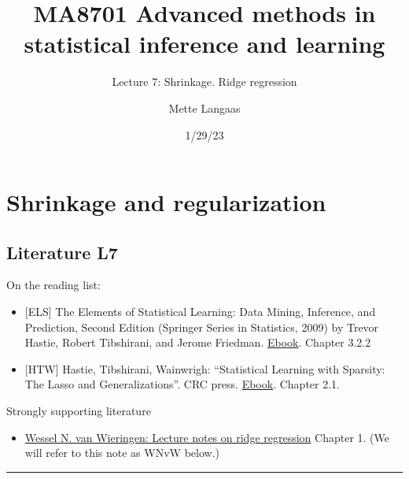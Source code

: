 \documentclass[
  letterpaper,
  DIV=11,
  numbers=noendperiod]{scrartcl}
\title{MA8701 Advanced methods in statistical inference and learning}
\subtitle{Lecture 7: Shrinkage. Ridge regression}
\author{Mette Langaas}
\date{1/29/23}
\providecommand{\tightlist}{%
  \setlength{\itemsep}{0pt}\setlength{\parskip}{0pt}}\usepackage{longtable,booktabs,array}
\renewcommand*\contentsname{Table of contents}
\newcommand\contentsname{Table of contents}
\begin{document}
\maketitle
\ifdefined\Shaded\renewenvironment{Shaded}{\begin{tcolorbox}[boxrule=0pt, enhanced, sharp corners, borderline west={3pt}{0pt}{shadecolor}, breakable, frame hidden, interior hidden]}{\end{tcolorbox}}\fi

\renewcommand*\contentsname{Table of contents}
{
\hypersetup{linkcolor=}
\setcounter{tocdepth}{3}
\tableofcontents
}
\hypertarget{shrinkage-and-regularization}{%
\section{Shrinkage and
regularization}\label{shrinkage-and-regularization}}

\hypertarget{literature-l7}{%
\subsection{Literature L7}\label{literature-l7}}

On the reading list:

\begin{itemize}
\item
  {[}ELS{]} The Elements of Statistical Learning: Data Mining,
  Inference, and Prediction, Second Edition (Springer Series in
  Statistics, 2009) by Trevor Hastie, Robert Tibshirani, and Jerome
  Friedman.
  \href{https://web.stanford.edu/~hastie/Papers/ESLII.pdf}{Ebook}.
  Chapter 3.2.2
\item
  {[}HTW{]} Hastie, Tibshirani, Wainwrigh: ``Statistical Learning with
  Sparsity: The Lasso and Generalizations''. CRC press.
  \href{https://trevorhastie.github.io/}{Ebook}. Chapter 2.1.
\end{itemize}

Strongly supporting literature

\begin{itemize}
\tightlist
\item
  \href{https://arxiv.org/pdf/1509.09169v7.pdf}{Wessel N. van Wieringen:
  Lecture notes on ridge regression} Chapter 1. (We will refer to this
  note as WNvW below.)
\end{itemize}

\begin{center}\rule{0.5\linewidth}{0.5pt}\end{center}
\end{document}
